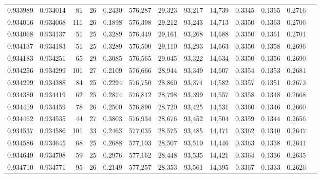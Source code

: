 \begin{tabular}{rrrrrrrrrrrrr}
0.933989 & 0.934014 &    81 &  26 &                                     0.2430 & 576,287 &  29,323 &  93,217 &  14,739 & 0.3345 & 0.1365 & 0.2716 \\
0.934016 & 0.934068 &   111 &  26 &                                     0.1898 & 576,398 &  29,212 &  93,243 &  14,713 & 0.3350 & 0.1363 & 0.2706 \\
0.934068 & 0.934137 &    51 &  25 &                                     0.3289 & 576,449 &  29,161 &  93,268 &  14,688 & 0.3350 & 0.1361 & 0.2701 \\
0.934137 & 0.934183 &    51 &  25 &                                     0.3289 & 576,500 &  29,110 &  93,293 &  14,663 & 0.3350 & 0.1358 & 0.2696 \\
0.934183 & 0.934251 &    65 &  29 &                                     0.3085 & 576,565 &  29,045 &  93,322 &  14,634 & 0.3350 & 0.1356 & 0.2690 \\
0.934256 & 0.934299 &   101 &  27 &                                     0.2109 & 576,666 &  28,944 &  93,349 &  14,607 & 0.3354 & 0.1353 & 0.2681 \\
0.934299 & 0.934388 &    84 &  25 &                                     0.2294 & 576,750 &  28,860 &  93,374 &  14,582 & 0.3357 & 0.1351 & 0.2673 \\
0.934389 & 0.934419 &    62 &  25 &                                     0.2874 & 576,812 &  28,798 &  93,399 &  14,557 & 0.3358 & 0.1348 & 0.2668 \\
0.934419 & 0.934459 &    78 &  26 &                                     0.2500 & 576,890 &  28,720 &  93,425 &  14,531 & 0.3360 & 0.1346 & 0.2660 \\
0.934462 & 0.934535 &    44 &  27 &                                     0.3803 & 576,934 &  28,676 &  93,452 &  14,504 & 0.3359 & 0.1344 & 0.2656 \\
0.934537 & 0.934586 &   101 &  33 &                                     0.2463 & 577,035 &  28,575 &  93,485 &  14,471 & 0.3362 & 0.1340 & 0.2647 \\
0.934586 & 0.934645 &    68 &  25 &                                     0.2688 & 577,103 &  28,507 &  93,510 &  14,446 & 0.3363 & 0.1338 & 0.2641 \\
0.934649 & 0.934708 &    59 &  25 &                                     0.2976 & 577,162 &  28,448 &  93,535 &  14,421 & 0.3364 & 0.1336 & 0.2635 \\
0.934710 & 0.934771 &    95 &  26 &                                     0.2149 & 577,257 &  28,353 &  93,561 &  14,395 & 0.3367 & 0.1333 & 0.2626 \\

\end{tabular}

